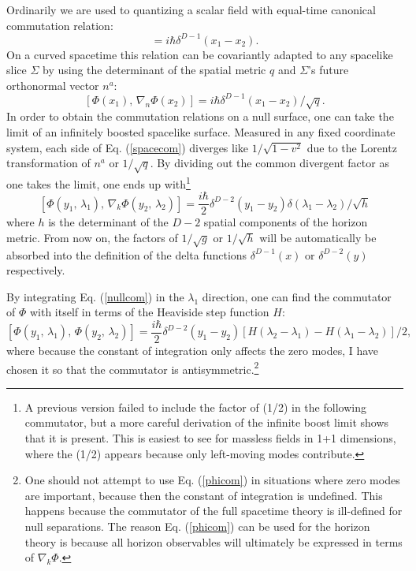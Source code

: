 \documentclass[12pt]{article}
\begin{document}
Ordinarily we are used to quantizing a scalar field with equal-time canonical commutation relation:
\begin{equation}
[\Phi(x_1),\,\dot{\Phi}(x_2)] = i\hbar \delta^{D-1}(x_1 - x_2).
\end{equation}
On a curved spacetime this relation can be covariantly adapted to any spacelike slice $\Sigma$ by using the determinant of the spatial metric $q$ and $\Sigma$'s future orthonormal vector $n^a$:
\begin{equation}\label{spacecom}
[\Phi(x_1),\,\nabla_n \Phi(x_2)] = i\hbar \delta^{D-1}(x_1 - x_2)/ \sqrt{q}.
\end{equation}
In order to obtain the commutation relations on a null surface, one can take the limit of an infinitely boosted spacelike surface.  Measured in any fixed coordinate system, each side of Eq. (\ref{spacecom}) diverges like $1/\sqrt{1 - v^2}$ due to the Lorentz transformation of $n^a$ or $1/\sqrt{q}$.  By dividing out the common divergent factor as one takes the limit, one ends up with\footnote{A previous version failed to include the factor of (1/2) in the following commutator, but a more careful derivation of the infinite boost limit shows that it is present.  This is easiest to see for massless fields in 1+1 dimensions, where the (1/2) appears because only left-moving modes contribute.}
\begin{equation}\label{nullcom}
[\Phi(y_1,\,\lambda_1),\,\nabla_k \Phi(y_2,\,\lambda_2)] =
\frac{i\hbar}{2} \delta^{D-2}(y_1 - y_2) \delta(\lambda_1 - \lambda_2)/ \sqrt{h}
\end{equation}
where $h$ is the determinant of the $D - 2$ spatial components of the horizon metric.  From now on, the factors of $1/\sqrt{g}$ or $1/\sqrt{h}$ will be automatically be absorbed into the definition of the delta functions $\delta^{D-1}(x)$ or $\delta^{D-2}(y)$ respectively.

By integrating Eq. (\ref{nullcom}) in the $\lambda_1$ direction, one can find the commutator of $\Phi$ with itself in terms of the Heaviside step function $H$:
\begin{equation}\label{phicom}
[\Phi(y_1,\,\lambda_1),\,\Phi(y_2,\,\lambda_2)] =
\frac{i\hbar}{2} \delta^{D-2}(y_1 - y_2)
[H(\lambda_2 - \lambda_1) - H(\lambda_1 - \lambda_2)]/2,
\end{equation}
where because the constant of integration only affects the zero modes, I have chosen it so that the commutator is antisymmetric.\footnote{One should not attempt to use Eq. (\ref{phicom}) in situations where zero modes are important, because then the constant of integration is undefined. This happens because the commutator of the full spacetime theory is ill-defined for null separations.  The reason Eq. (\ref{phicom}) can be used for the horizon theory is because all horizon observables will ultimately be expressed in terms of $\nabla_k \Phi$.}
\end{document}
